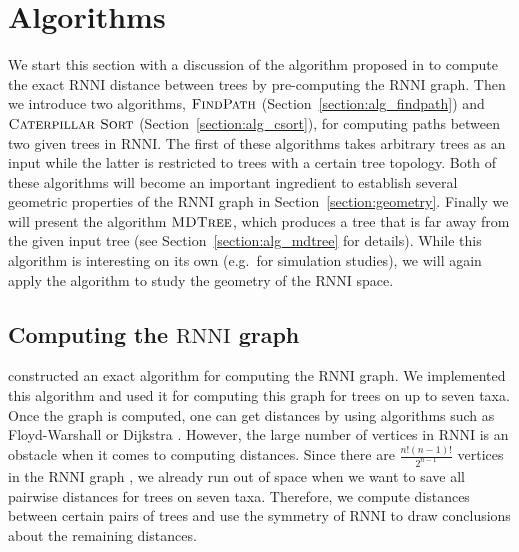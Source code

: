 \documentclass{amsart}
\newcommand{\rnni}{\mathrm{RNNI}}
\newcommand{\csort}{\textsc{Caterpillar Sort}}
\newcommand{\findpath}{\textsc{FindPath}}
\newcommand{\mdtree}{\textsc{MDTree}}
\begin{document}
\section{Algorithms}
\label{section:algorithms}

We start this section with a discussion of the algorithm proposed in \autocite{Gavryushkin2018-ol} to compute the exact $\rnni$ distance between trees by pre-computing the $\rnni$ graph.
Then we introduce two algorithms, $\findpath$ (Section~\ref{section:alg_findpath}) and $\csort$ (Section~\ref{section:alg_csort}), for computing paths between two given trees in $\rnni$.
The first of these algorithms takes arbitrary trees as an input while the latter is restricted to trees with a certain tree topology.
Both of these algorithms will become an important ingredient to establish several geometric properties of the $\rnni$ graph in Section~\ref{section:geometry}.
Finally we will present the algorithm $\mdtree$, which produces a tree that is far away from the given input tree (see Section~\ref{section:alg_mdtree} for details).
While this algorithm is interesting on its own (e.g.\ for simulation studies), we will again apply the algorithm to study the geometry of the $\rnni$ space.


\subsection{Computing the $\rnni$ graph}
\label{section:alg_RNNI_graph}

\textcite[Section 3.3]{Gavryushkin2018-ol} constructed an exact algorithm for computing the $\rnni$ graph.
We implemented this algorithm and used it for computing this graph for trees on up to seven taxa.
Once the graph is computed, one can get distances by using algorithms such as Floyd-Warshall \autocite{Floyd1962-ew} or Dijkstra \autocite{Dijkstra1959-ph}.
However, the large number of vertices in $\rnni$ is an obstacle when it comes to computing distances.
Since there are $\frac{n!(n-1)!}{2^{n-1}}$ vertices in the $\rnni$ graph \autocite{Gavryushkin2018-ol}, we already run out of space when we want to save all pairwise distances for trees on seven taxa.
Therefore, we compute distances between certain pairs of trees and use the symmetry of $\rnni$ to draw conclusions about the remaining distances.
\end{document}
